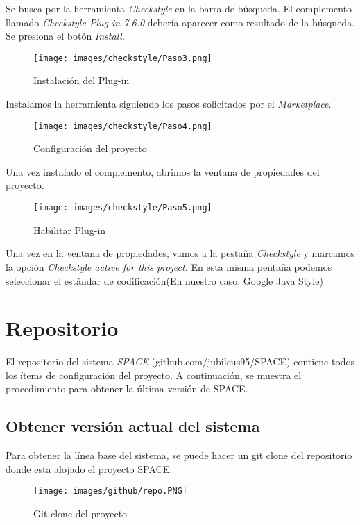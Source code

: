 \documentclass{scrreprt}
\begin{document}
Se busca por la herramienta \textit{Checkstyle} en la barra de búsqueda. El complemento llamado \textit{Checkstyle Plug-in 7.6.0} debería aparecer como resultado de la búsqueda. Se presiona el botón \textit{Install}.

\begin{figure}[H]
	\centering
    \texttt{[image: images/checkstyle/Paso3.png]}
    \caption{Instalación del Plug-in}\label{}
\end{figure}

Instalamos la herramienta siguiendo los pasos solicitados por el \textit{Marketplace}.

\begin{figure}[H]
	\centering
    \texttt{[image: images/checkstyle/Paso4.png]}
    \caption{Configuración del proyecto}\label{}
\end{figure}

Una vez instalado el complemento, abrimos la ventana de propiedades del proyecto.

\begin{figure}[H]
	\centering
    \texttt{[image: images/checkstyle/Paso5.png]}
    \caption{Habilitar Plug-in}
\end{figure}

Una vez en la ventana de propiedades, vamos a la pestaña \textit{Checkstyle} y marcamos la opción \textit{Checkstyle active for this project.} En esta misma pentaña podemos seleccionar el estándar de codificación(En nuestro caso, Google Java Style)



\chapter{Repositorio}

El repositorio del sistema \textit{SPACE} (github.com/jubileus95/SPACE) contiene todos los ítems de configuración del proyecto. A continuación, se muestra el procedimiento para obtener la última versión de SPACE.

\section{Obtener versión actual del sistema}

Para obtener la línea base del sistema, se puede hacer un git clone del repositorio donde esta alojado el proyecto SPACE. 

\begin{figure}[H]
	\centering
    \texttt{[image: images/github/repo.PNG]}
    \caption{Git clone del proyecto}
\end{figure}
\end{document}
